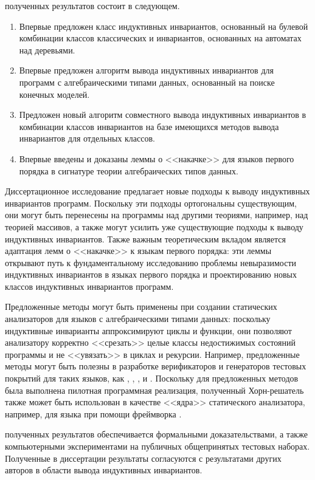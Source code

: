 {\novelty{} полученных результатов состоит в следующем.}
\begin{enumerate}[beginpenalty=10000] %
  \item Впервые предложен класс индуктивных инвариантов, основанный на булевой комбинации классов классических и инвариантов, основанных на автоматах над деревьями.
  \item Впервые предложен алгоритм вывода индуктивных инвариантов для программ с алгебраическими типами данных, основанный на поиске конечных моделей.
  \item Предложен новый алгоритм совместного вывода индуктивных инвариантов в комбинации классов инвариантов на базе имеющихся методов вывода инвариантов для отдельных классов.
  \item Впервые введены и доказаны леммы о <<накачке>> для языков первого порядка в сигнатуре теории алгебраических типов данных.
\end{enumerate}

{\influenceTh}
Диссертационное исследование предлагает новые подходы к выводу индуктивных инвариантов программ. Поскольку эти подходы ортогональны существующим, они могут быть перенесены на программы над другими теориями, например, над теорией массивов, а также могут усилить уже существующие подходы к выводу индуктивных инвариантов. Также важным теоретическим вкладом является адаптация лемм о <<накачке>> к языкам первого порядка: эти леммы открывают путь к фундаментальному исследованию проблемы невыразимости индуктивных инвариантов в языках первого порядка и проектированию новых классов индуктивных инвариантов программ.

{\influencePr}
Предложенные методы могут быть применены при создании  статических анализаторов для языков с алгебраическими типами данных: поскольку индуктивные инварианты аппроксимируют циклы и функции, они позволяют анализатору корректно <<срезать>> целые классы недостижимых состояний программы и не <<увязать>> в циклах и рекурсии.
Например, предложенные методы могут быть полезны в разработке верификаторов и генераторов тестовых покрытий для таких языков, как \rust{}, \scala{}, \solidity{}, \haskell{} и \ocaml{}.
Поскольку для предложенных методов была выполнена пилотная программная реализация, полученный Хорн-решатель также может быть использован в качестве <<ядра>> статического анализатора, например, для языка \rust{} при помощи фреймворка \rustHorn{}.

{\reliability} полученных результатов обеспечивается формальными доказательствами, а также компьютерными экспериментами на публичных общепринятых тестовых наборах.
Полученные в диссертации результаты согласуются с результатами других авторов в области вывода индуктивных инвариантов.

